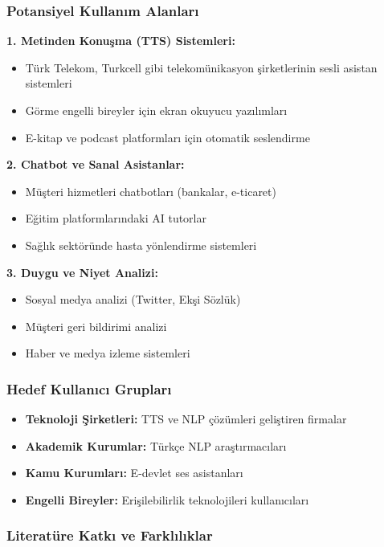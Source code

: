 \documentclass[conference]{IEEEtran}
\begin{document}
\subsubsection*{Potansiyel Kullanım Alanları}
\hfill \break
\textbf{1. Metinden Konuşma (TTS) Sistemleri:}
\begin{itemize}
    \item Türk Telekom, Turkcell gibi telekomünikasyon şirketlerinin sesli asistan sistemleri
    \item Görme engelli bireyler için ekran okuyucu yazılımları
    \item E-kitap ve podcast platformları için otomatik seslendirme
\end{itemize}

\textbf{2. Chatbot ve Sanal Asistanlar:}
\begin{itemize}
    \item Müşteri hizmetleri chatbotları (bankalar, e-ticaret)
    \item Eğitim platformlarındaki AI tutorlar
    \item Sağlık sektöründe hasta yönlendirme sistemleri
\end{itemize}

\textbf{3. Duygu ve Niyet Analizi:}
\begin{itemize}
    \item Sosyal medya analizi (Twitter, Ekşi Sözlük)
    \item Müşteri geri bildirimi analizi
    \item Haber ve medya izleme sistemleri
\end{itemize}

\subsubsection*{Hedef Kullanıcı Grupları}
\begin{itemize}
    \item \textbf{Teknoloji Şirketleri:} TTS ve NLP çözümleri geliştiren firmalar
    \item \textbf{Akademik Kurumlar:} Türkçe NLP araştırmacıları
    \item \textbf{Kamu Kurumları:} E-devlet ses asistanları
    \item \textbf{Engelli Bireyler:} Erişilebilirlik teknolojileri kullanıcıları
\end{itemize}

\subsubsection*{\large Literatüre Katkı ve Farklılıklar}
\end{document}
